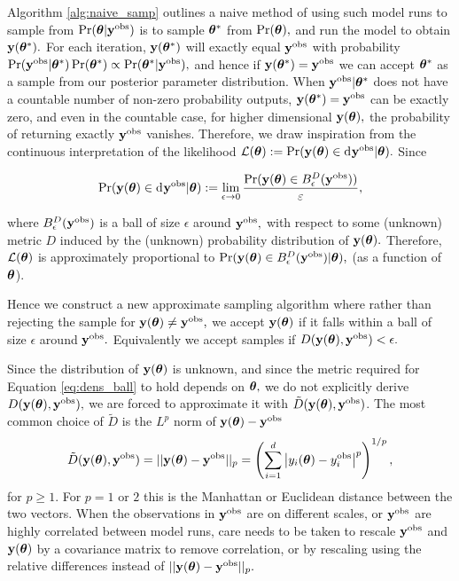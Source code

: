 Algorithm \ref{alg:naive_samp} outlines a naive method of using such model
runs to sample from
$\Pr(\bm{\theta}|\mathbf{y}^{\mathrm{obs}})$ is to sample
$\bm{\theta}^\ast$ from $\Pr(\bm{\theta}),$ and run the model to obtain
$\mathbf{y}(\bm{\theta}^\ast).$ For each iteration,
$\mathbf{y}(\bm{\theta}^\ast)$ will exactly equal $\mathbf{y}^{\mathrm{obs}}$
with probability $\Pr(\mathbf{y}^{\mathrm{obs}}|\bm{\theta}^\ast)\Pr(\bm{\theta}^\ast)
    \propto \Pr(\bm{\theta}^\ast|\mathbf{y}^{\mathrm{obs}}),$
and hence if $\mathbf{y}(\bm{\theta}^\ast) = \mathbf{y}^{\mathrm{obs}}$ we can accept $\bm{\theta}^\ast$ 
as a sample
from our posterior parameter distribution. When
$\mathbf{y}^{\mathrm{obs}}|\bm{\theta}^\ast$ does not have a countable number of non-zero
probability outputs,
$\mathbf{y}(\bm{\theta}^\ast) = \mathbf{y}^{\mathrm{obs}}$ can be exactly zero, and even in the
countable case, for
higher dimensional $\mathbf{y}(\bm{\theta}),$ the probability of returning exactly
$\mathbf{y}^{\mathrm{obs}}$ vanishes. Therefore, we draw inspiration from the continuous
interpretation of the likelihood
$\mathcal{L}(\btheta) := \Pr(\by(\btheta) \in \diff \by^\obs|\btheta).$
Since

\begin{equation}\label{eq:dens_ball}
    \Pr(\by(\btheta) \in \diff \by^\obs|\btheta)
    := \lim_{\epsilon \to 0}
    \frac{\Pr(\by(\btheta) \in B^D_\epsilon(\by^\obs))}{\varepsilon},
\end{equation}

where $B^D_\epsilon(\mathbf{y}^{\mathrm{obs}})$ is a ball of size $\epsilon$ around $\mathbf{y}^{\mathrm{obs}},$
with respect to some (unknown) metric $D$ induced by the (unknown)
probability distribution of $\mathbf{y}(\bm{\theta}).$ Therefore, $\mathcal{L}(\bm{\theta})$ is
approximately proportional
to $\Pr(\mathbf{y}(\bm{\theta}) \in B^D_\epsilon(\mathbf{y}^{\mathrm{obs}}) | \bm{\theta}),$
(as a function of $\bm{\theta}$).

Hence we construct a new approximate sampling algorithm where rather than
rejecting the sample for $\mathbf{y}(\bm{\theta}) \neq \mathbf{y}^{\mathrm{obs}},$ we accept
$\mathbf{y}(\bm{\theta})$ if it falls within a ball of size $\epsilon$ around $\mathbf{y}^{\mathrm{obs}}.$
Equivalently we accept samples if $D(\mathbf{y}(\bm{\theta}), \mathbf{y}^{\mathrm{obs}}) < \epsilon.$

Since the distribution of $\mathbf{y}(\bm{\theta})$ is unknown, and since the metric
required for Equation \ref{eq:dens_ball} to hold depends on $\bm{\theta},$ we do
not explicitly derive $D(\mathbf{y}(\bm{\theta}), \mathbf{y}^{\mathrm{obs}}),$ we are forced to
approximate it with $\tilde{D}(\mathbf{y}(\bm{\theta}), \mathbf{y}^{\mathrm{obs}})$. The most common choice
of $\tilde{D}$ is the $L^p$ norm of $\mathbf{y}(\bm{\theta}) - \mathbf{y}^{\mathrm{obs}}$
$$
    \tilde{D}(\mathbf{y}(\bm{\theta}), \mathbf{y}^{\mathrm{obs}})
    =||\mathbf{y}(\bm{\theta}) - \mathbf{y}^{\mathrm{obs}}||_p
    = \left(\sum_{i = 1}^d
    \left|y_i(\bm{\theta})
    - y_i^{\mathrm{obs}}\right|^p\right)^{1/p},
$$
for $p\geq 1.$ For $p=1$ or $2$ this is the Manhattan or Euclidean distance
between the two vectors. When the observations in $\mathbf{y}^{\mathrm{obs}}$ are on different
scales, or $\mathbf{y}^{\mathrm{obs}}$ are highly correlated between model runs, care needs to
be taken to rescale $\mathbf{y}^{\mathrm{obs}}$ and $\mathbf{y}(\bm{\theta})$ by a covariance matrix to
remove correlation, or by rescaling using the relative differences instead of
$||\mathbf{y}(\bm{\theta}) - \mathbf{y}^{\mathrm{obs}}||_p.$

